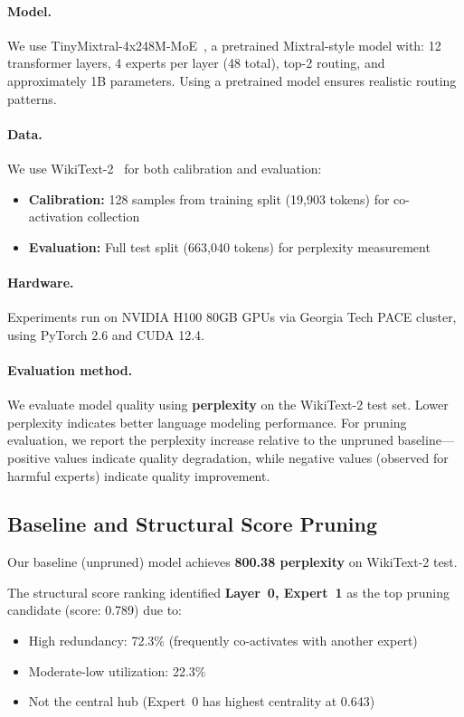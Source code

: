 \documentclass{article}
\begin{document}
\paragraph{Model.}
We use TinyMixtral-4x248M-MoE~\citep{tinymixtralhf}, a pretrained Mixtral-style model with:
12 transformer layers, 4 experts per layer (48 total), top-2 routing, and
approximately 1B parameters.
Using a pretrained model ensures realistic routing patterns.

\paragraph{Data.}
We use WikiText-2~\citep{merity2017pointer} for both calibration and evaluation:
\begin{itemize}
    \item \textbf{Calibration:} 128 samples from training split (19,903 tokens) for co-activation collection
    \item \textbf{Evaluation:} Full test split (663,040 tokens) for perplexity measurement
\end{itemize}

\paragraph{Hardware.}
Experiments run on NVIDIA H100 80GB GPUs via Georgia Tech PACE cluster, using
PyTorch 2.6 and CUDA 12.4.

\paragraph{Evaluation method.}
We evaluate model quality using \textbf{perplexity} on the WikiText-2 test set.
Lower perplexity indicates better language modeling performance.
For pruning evaluation, we report the perplexity increase relative to the unpruned
baseline---positive values indicate quality degradation, while negative values
(observed for harmful experts) indicate quality improvement.

\subsection{Baseline and Structural Score Pruning}

Our baseline (unpruned) model achieves \textbf{800.38 perplexity} on WikiText-2 test.

The structural score ranking identified \textbf{Layer~0, Expert~1} as the top
pruning candidate (score: 0.789) due to:
\begin{itemize}
    \item High redundancy: 72.3\% (frequently co-activates with another expert)
    \item Moderate-low utilization: 22.3\%
    \item Not the central hub (Expert~0 has highest centrality at 0.643)
\end{itemize}
\end{document}
